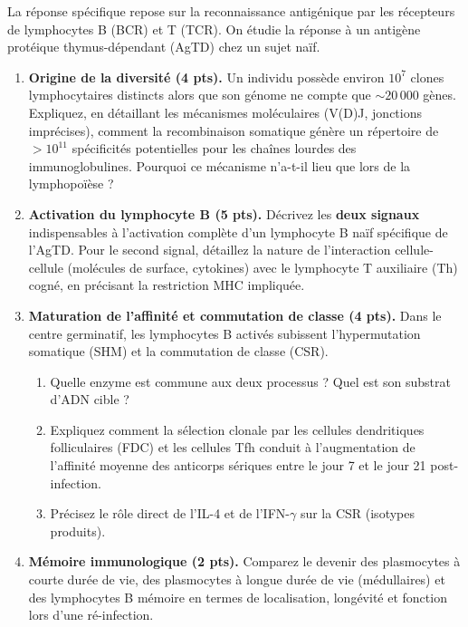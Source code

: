 \documentclass[11pt]{article}
\begin{document}
\begin{exercice}
La réponse spécifique repose sur la reconnaissance antigénique par les récepteurs de lymphocytes B (BCR) et T (TCR). On étudie la réponse à un antigène protéique thymus-dépendant (AgTD) chez un sujet naïf.

\begin{enumerate}
    \item \textbf{Origine de la diversité (4 pts).} Un individu possède environ $10^7$ clones lymphocytaires distincts alors que son génome ne compte que $\sim 20\,000$ gènes. Expliquez, en détaillant les mécanismes moléculaires (V(D)J, jonctions imprécises), comment la recombinaison somatique génère un répertoire de $>10^{11}$ spécificités potentielles pour les chaînes lourdes des immunoglobulines. Pourquoi ce mécanisme n'a-t-il lieu que lors de la lymphopoïèse ?
    
    \item \textbf{Activation du lymphocyte B (5 pts).} Décrivez les \textbf{deux signaux} indispensables à l'activation complète d'un lymphocyte B naïf spécifique de l'AgTD. Pour le second signal, détaillez la nature de l'interaction cellule-cellule (molécules de surface, cytokines) avec le lymphocyte T auxiliaire (Th) cogné, en précisant la restriction MHC impliquée.
    
    \item \textbf{Maturation de l'affinité et commutation de classe (4 pts).} Dans le centre germinatif, les lymphocytes B activés subissent l'hypermutation somatique (SHM) et la commutation de classe (CSR).
    \begin{enumerate}
        \item Quelle enzyme est commune aux deux processus ? Quel est son substrat d'ADN cible ?
        \item Expliquez comment la sélection clonale par les cellules dendritiques folliculaires (FDC) et les cellules Tfh conduit à l'augmentation de l'affinité moyenne des anticorps sériques entre le jour 7 et le jour 21 post-infection.
        \item Précisez le rôle direct de l'IL-4 et de l'IFN-$\gamma$ sur la CSR (isotypes produits).
    \end{enumerate}
    
    \item \textbf{Mémoire immunologique (2 pts).} Comparez le devenir des plasmocytes à courte durée de vie, des plasmocytes à longue durée de vie (médullaires) et des lymphocytes B mémoire en termes de localisation, longévité et fonction lors d'une ré-infection.
\end{enumerate}
\end{exercice}
\end{document}
